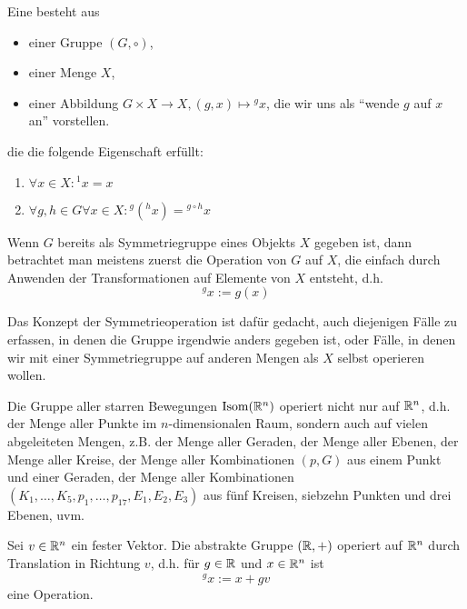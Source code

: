 \begin{definition}
Eine  besteht aus
\begin{itemize}
\item einer Gruppe $(G,\circ)$,
\item einer Menge $X$,
\item einer Abbildung $G\times X\to X, (g,x)\mapsto{^g x}$, die wir uns als \enquote{wende $g$ auf $x$ an} vorstellen.
\end{itemize}
die die folgende Eigenschaft erfüllt:
\begin{enumerate}
\item $\forall x\in X: {^1 x} = x$
\item $\forall g,h\in G \forall x\in X: {^g(^h x)} = {^{g\circ h}x}$
\end{enumerate}
\end{definition}

\begin{example}
Wenn $G$ bereits als Symmetriegruppe eines Objekts $X$ gegeben ist, dann betrachtet man meistens zuerst die Operation von $G$ auf $X$, die einfach durch Anwenden der Transformationen auf Elemente von $X$ entsteht, d.h.
\[{^g x} := g(x)\]

Das Konzept der Symmetrieoperation ist dafür gedacht, auch diejenigen Fälle zu erfassen, in denen die Gruppe irgendwie anders gegeben ist, oder Fälle, in denen wir mit einer Symmetriegruppe auf anderen Mengen als $X$ selbst operieren wollen.
\end{example}

\begin{example}
Die Gruppe aller starren Bewegungen $\operatorname{Isom}(\mathbb{R}^n)$ operiert nicht nur auf $\mathbb{R}^n$, d.h. der Menge aller Punkte im $n$-dimensionalen Raum, sondern auch auf vielen abgeleiteten Mengen, z.B. der Menge aller Geraden, der Menge aller Ebenen, der Menge aller Kreise, der Menge aller Kombinationen $(p,G)$ aus einem Punkt und einer Geraden, der Menge aller Kombinationen $(K_1,\ldots,K_5, p_1,\ldots,p_{17}, E_1,E_2,E_3)$ aus fünf Kreisen, siebzehn Punkten und drei Ebenen, uvm.
\end{example}

\begin{example}
Sei $v\in\mathbb{R}^n$ ein fester Vektor. Die abstrakte Gruppe $(\mathbb{R},+)$ operiert auf $\mathbb{R}^n$ durch Translation in Richtung $v$, d.h. für $g\in\mathbb{R}$ und $x\in\mathbb{R}^n$ ist
\[{^g x} := x+gv\]
eine Operation.
\end{example}

